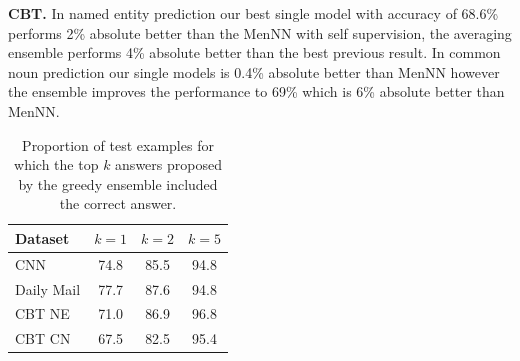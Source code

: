 \documentclass[11pt]{article}
\begin{document}

\textbf{CBT.} In named entity prediction our best single model with accuracy of 68.6\% performs 2\% absolute better than the \gls{MenNN} with self supervision, the averaging ensemble performs 4\% absolute better than the best previous result. In common noun prediction our single models is 0.4\% absolute better than \gls{MenNN} however the ensemble improves the performance to 69\% which is 6\% absolute better than \gls{MenNN}.






\begin{table}[h]
\centering

  \begin{tabular}{l|ccc}%
    \toprule
    Dataset & $k=1$ & $k=2$ & $k=5$\\
    
    \midrule
    
        CNN & 74.8 & 85.5 & 94.8\\
        Daily Mail & 77.7 & 87.6 & 94.8\\
        CBT NE & 71.0 & 86.9 & 96.8 \\
        CBT CN& 67.5 & 82.5 & 95.4 \\ 
    
     \bottomrule
  \end{tabular}
\caption{Proportion of test examples for which the top $k$ answers proposed by the greedy ensemble included the correct answer.}
\label{tab:results-nBest}
\end{table}
\end{document}
